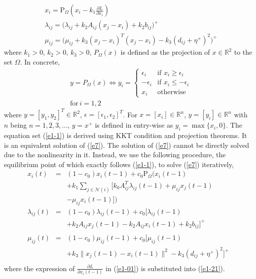 \documentclass[journal]{IEEEtran}
\begin{document}
\begin{subequations}\label{e1-1}
\begin{align}
&x_i=\text{P}_{\Omega}(x_i-k_1\frac{\partial L}{\partial x_i})\\
&\lambda_{ij}=\big(\lambda_{ij}+k_2A_{ij}(x_j-x_i)+k_2b_{ij}\big)^+ \\
&\mu_{ij}=\big(\mu_{ij}+k_3(x_j-x_i)^T(x_j-x_i)-k_3(d_{ij}+\eta^+)^2\big)^+
\end{align}
\end{subequations}
where $k_1>0$, $k_2>0$, $k_3>0$, $P_\Omega(x)$ is defined as the projection of $x\in\mathbb{R}^2$ to the set $\Omega$. In concrete,
\begin{eqnarray}
&y=P_\Omega(x)\Leftrightarrow
y_i=\begin{cases}
   \epsilon_i        & \text{if } x_i\geq\epsilon_i \\
   -\epsilon_i      & \text{if } x_i\leq-\epsilon_i\\
   x_i &\text{otherwise}
  \end{cases}\nonumber\\
&\text{for}\,i=1,2
\end{eqnarray}
where $y=[y_1, y_2]^T\in\mathbb{R}^2$, $\epsilon=[\epsilon_1, \epsilon_2]^T$. For $x=[x_i]\in\mathbb{R}^n$, $y=[y_i]\in\mathbb{R}^n$ with $n$ being $n=1,2,3,...$, $y=x^+$ is defined in entry-wise as $y_i=\max\{x_i, 0\}$. The equation set (\ref{e1-1}) is derived using KKT condition and projection theorems. It is an equivalent solution of (\ref{e7}). The solution of (\ref{e7}) cannot be directly solved due to the nonlinearity in it. Instead, we use the following procedure, the equilibrium point of which exactly follows (\ref{e1-1}), to solve (\ref{e7}) iteratively,
\begin{subequations}\label{e1-2}
\begin{eqnarray}
x_i(t)&=&(1-c_0)x_i(t-1)+c_0\text{P}_{\Omega}\bigg(x_i(t-1)\nonumber\\
&&+k_1\sum_{j\in\mathcal{N}(i)}[k_0A^T_{ij}\lambda_{ij}(t-1)+\mu_{ij}x_j(t-1)\nonumber\\
&&-\mu_{ij}x_i(t-1)]\bigg)\label{e1-21}\\
\lambda_{ij}(t)&=&(1-c_0)\lambda_{ij}(t-1)+c_0[\lambda_{ij}(t-1)\nonumber\\ &&+k_2A_{ij}x_j(t-1)-k_2A_{ij}x_i(t-1)+k_2b_{ij}]^+ \nonumber\\
&&\,\\
\mu_{ij}(t)&=&(1-c_0)\mu_{ij}(t-1)+c_0[\mu_{ij}(t-1)\nonumber\\
&&+k_3\|x_j(t-1)-x_i(t-1)\|^2-k_3(d_{ij}+\eta^+)^2]^+\nonumber\\
&&\,
\end{eqnarray}
\end{subequations}
where the expression of $\frac{\partial L}{\partial x_i(t-1)}$ in (\ref{e1-01}) is substituted into (\ref{e1-21}).
\end{document}
